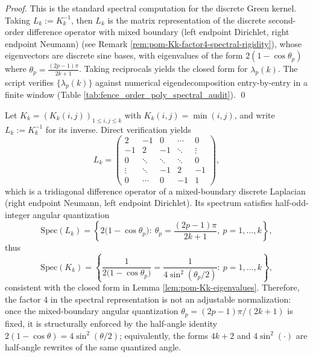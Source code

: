 \begin{proof}
This is the standard spectral computation for the discrete Green kernel. Taking \(L_k:=K_k^{-1}\), then \(L_k\) is the matrix representation of the discrete second-order difference operator with mixed boundary (left endpoint Dirichlet, right endpoint Neumann) (see Remark \ref{rem:pom-Kk-factor4-spectral-rigidity}),
whose eigenvectors are discrete sine bases, with eigenvalues of the form \(2(1-\cos\theta_p)\) where \(\theta_p=\frac{(2p-1)\pi}{2k+1}\).
Taking reciprocals yields the closed form for \(\lambda_p(k)\).
The script verifies \(\{\lambda_p(k)\}\) against numerical eigendecomposition entry-by-entry in a finite window (Table \ref{tab:fence_order_poly_spectral_audit}). \qed
\end{proof}

\begin{remark}\label{rem:pom-Kk-factor4-spectral-rigidity}
Let \(K_k=(K_k(i,j))_{1\le i,j\le k}\) with \(K_k(i,j)=\min(i,j)\), and write \(L_k:=K_k^{-1}\) for its inverse.
Direct verification yields
\[
L_k=
\begin{pmatrix}
2 & -1 & 0 & \cdots & 0\\
-1 & 2 & -1 & \ddots & \vdots\\
0 & \ddots & \ddots & \ddots & 0\\
\vdots & \ddots & -1 & 2 & -1\\
0 & \cdots & 0 & -1 & 1
\end{pmatrix},
\]
which is a tridiagonal difference operator of a mixed-boundary discrete Laplacian (right endpoint Neumann, left endpoint Dirichlet).
Its spectrum satisfies half-odd-integer angular quantization
\[
\mathrm{Spec}(L_k)=
\left\{
2\bigl(1-\cos\theta_p\bigr):\
\theta_p=\frac{(2p-1)\pi}{2k+1},\ p=1,\dots,k
\right\},
\]
thus
\[
\mathrm{Spec}(K_k)=
\left\{
\frac{1}{2\bigl(1-\cos\theta_p\bigr)}
=
\frac{1}{4\sin^2(\theta_p/2)}:\ p=1,\dots,k
\right\},
\]
consistent with the closed form in Lemma \ref{lem:pom-Kk-eigenvalues}.
Therefore, the factor 4 in the spectral representation is not an adjustable normalization: once the mixed-boundary angular quantization \(\theta_p=(2p-1)\pi/(2k+1)\) is fixed,
it is structurally enforced by the half-angle identity \(2(1-\cos\theta)=4\sin^2(\theta/2)\);
equivalently, the forms \(4k+2\) and \(4\sin^2(\cdot)\) are half-angle rewrites of the same quantized angle.
\end{remark}

